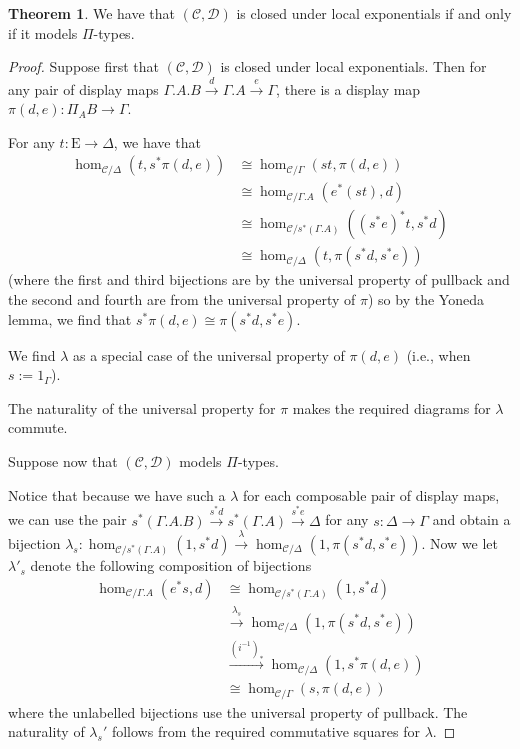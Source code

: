 \documentclass{article}
\theoremstyle{definition}
\newtheorem{theorem}[definition]{Theorem}
\newcommand{\C}{\mathcal C}
\newcommand{\D}{\mathcal D}
\newcommand{\Epsilon}{\mathrm E}
\begin{document}
\begin{theorem}
    We have that $(\C, \D)$ is closed under local exponentials if and only if it models $\Pi$-types.
\end{theorem}

\begin{proof}
Suppose first that $(\C, \D)$ is closed under local exponentials.
Then for any pair of display maps $\Gamma.A . B \xrightarrow{d} \Gamma. A  \xrightarrow{e} \Gamma$, there is a display map $\pi(d,e) : \Pi_A B \to \Gamma$.

For any $t : \Epsilon \to \Delta$, we have that
\begin{align*}
    \hom_{\C / \Delta} (t, s^* {\pi(d,e)}) &\cong \hom_{\C / \Gamma} (st, {\pi(d,e)}) \\
    &\cong \hom_{\C / \Gamma . A} (e^* (st), d) \\
    &\cong \hom_{\C / s^* (\Gamma . A)} ((s^* e)^* t, s^* d) \\
    &\cong \hom_{\C / \Delta}(t, \pi(s^* d, s^* e))
\end{align*}
(where the first and third bijections are by the universal property of pullback and the second and fourth are from the universal property of $\pi$)
so by the Yoneda lemma, we find that $s^* {\pi(d,e)} \cong \pi(s^* d, s^* e)$.

We find $\lambda$ as a special case of the universal property of $\pi(d,e)$ (i.e., when $s := 1_\Gamma$).

The naturality of the universal property for $\pi$ makes the required diagrams for $\lambda$ commute.


Suppose now that $(\C, \D)$ models $\Pi$-types.
 
Notice that because we have such a $\lambda$ for each composable pair of display maps, we can use the pair $s^* (\Gamma.A . B) \xrightarrow{s^* d} s^* (\Gamma. A)  \xrightarrow{s^* e} \Delta$ for any $s : \Delta \to \Gamma$ and obtain a bijection $\lambda_s : \hom_{\C / s^*(\Gamma . A)} (1, s^* d) \xrightarrow{\lambda} \hom_{\C / \Delta} (1 , {\pi(s^* d,s^* e)}) $.
Now we let $\lambda'_s$ denote the following composition of bijections
\begin{align*}
    \hom_{\C / \Gamma . A} (e^* s,  d) &\cong
    \hom_{\C / s^*(\Gamma . A)} (1, s^* d) 
    \\&\xrightarrow{\lambda_s} \hom_{\C / \Delta} (1 , {\pi(s^* d,s^* e)})\\
     &\xrightarrow{(i^{-1})_*} \hom_{\C / \Delta} (1 , s^* {\pi( d, e)}) \\
     &\cong \hom_{\C / \Gamma} (s, {\pi(d,e)})
\end{align*}
where the unlabelled bijections use the universal property of pullback.
The naturality of $\lambda_s'$ follows from the required commutative squares for $\lambda$.
\end{proof}
\end{document}
